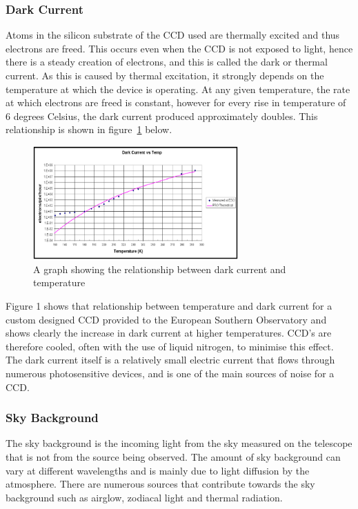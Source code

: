 	\subsubsection{Dark Current} %
	\label{ssub:dark_current}
		Atoms in the silicon substrate of the CCD used are thermally excited and thus electrons are freed. This occurs even when the CCD is not exposed to light, hence there is a steady creation of electrons, and this is called the dark or thermal current. As this is caused by thermal excitation, it strongly depends on the temperature at which the device is operating. At any given temperature, the rate at which electrons are freed is constant, however for every rise in temperature of 6 degrees Celsius, the dark current produced approximately doubles\cite[p.~124--125]{Astronomical_Image_Processing}. This relationship is shown in figure~\ref{fig:dark_current} below\cite{Southern_Observatory_throughput}.
		\begin{figure}[!htb]
			\centering
			\includegraphics[width=0.7\textwidth]{../Images/Dark.png}
			\caption{A graph showing the relationship between dark current and temperature}\label{fig:dark_current}
		\end{figure}

		Figure 1 shows that relationship between temperature and dark current for a custom designed CCD provided to the European Southern Observatory and shows clearly the increase in dark current at higher temperatures. CCD's are therefore cooled, often with the use of liquid nitrogen, to minimise this effect. The dark current itself is a relatively small electric current that flows through numerous photosensitive devices, and is one of the main sources of noise for a CCD.

	\subsubsection{Sky Background} %
	\label{ssub:sky_background}
		The sky background is the incoming light from the sky measured on the telescope that is not from the source being observed. The amount of sky background can vary at different wavelengths and is mainly due to light diffusion by the atmosphere. There are numerous sources that contribute towards the sky background such as airglow, zodiacal light and thermal radiation.

